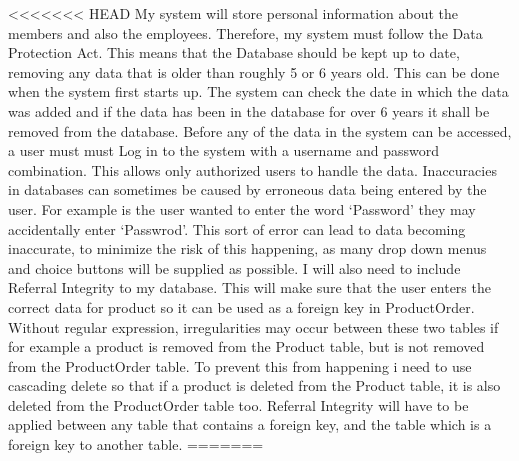 <<<<<<< HEAD
My system will store personal information about the members and also the employees. Therefore, my system must follow the Data Protection Act. This means that the Database should be kept up to date, removing any data that is older than roughly 5 or 6 years old. This can be done when the system first starts up. The system can check the date in which the data was added and if the data has been in the database for over 6 years it shall be removed from the database. Before any of the data in the system can be accessed, a user must must Log in to the system with a username and password combination. This allows only authorized users to handle the data. Inaccuracies in databases can sometimes be caused by erroneous data being entered by the user. For example is the user wanted to enter the word `Password' they may accidentally enter `Passwrod'. This sort of error can lead to data becoming inaccurate, to minimize the risk of this happening, as many drop down menus and choice buttons will be supplied as possible. I will also need to include Referral Integrity to my database. This will make sure that the user enters the correct data for product so it can be used as a foreign key in ProductOrder. Without regular expression, irregularities may occur between these two tables if for example a product is removed from the Product table, but is not removed from the ProductOrder table. To prevent this from happening i need to use cascading delete so that if a product is deleted from the Product table, it is also deleted from the ProductOrder table too. Referral Integrity will have to be applied between any table that contains a foreign key, and the table which is a foreign key to another table.
=======
